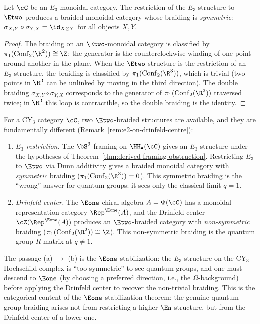 \begin{proposition}
\label{prop:e3-symmetric-braiding}
Let $\cC$ be an $E_3$-monoidal category. The restriction of the
$E_3$-structure to $\Etwo$ produces a braided monoidal category
whose braiding is \emph{symmetric}:
$\sigma_{X,Y} \circ \sigma_{Y,X} = \id_{X \otimes Y}$
for all objects $X, Y$.
\end{proposition}

\begin{proof}
The braiding on an $\Etwo$-monoidal category is classified by
$\pi_1(\mathrm{Conf}_2(\R^2)) \cong \Z$: the generator is
the counterclockwise winding of one point around another
in the plane. When the $\Etwo$-structure is the restriction
of an $E_3$-structure, the braiding is classified by
$\pi_1(\mathrm{Conf}_2(\R^3))$, which is trivial (two points
in $\R^3$ can be unlinked by moving in the third direction).
The double braiding
$\sigma_{X,Y} \circ \sigma_{Y,X}$ corresponds to the
generator of $\pi_1(\mathrm{Conf}_2(\R^2))$ traversed twice;
in $\R^3$ this loop is contractible, so the double braiding
is the identity.
\end{proof}

\begin{remark}
\label{rem:two-sources-e2}
For a CY$_3$ category $\cC$, two $\Etwo$-braided structures
are available, and they are fundamentally different
(Remark~\ref{rem:e2-on-drinfeld-centre}):
\begin{enumerate}[label=(\alph*)]
 \item \emph{$E_3$-restriction.}
 The $\bS^3$-framing on $\HH_\bullet(\cC)$ gives an
 $E_3$-structure under the hypotheses of Theorem~\ref{thm:derived-framing-obstruction}. Restricting $E_3$ to $\Etwo$
 via Dunn additivity gives a braided monoidal category
 with \emph{symmetric} braiding
 ($\pi_1(\mathrm{Conf}_2(\R^3)) = 0$). This symmetric
 braiding is the ``wrong'' answer for quantum groups: it sees
 only the classical limit $q = 1$.
 \item \emph{Drinfeld center.}
 The $\Eone$-chiral algebra $A = \Phi(\cC)$ has a monoidal
 representation category $\Rep^{\Eone}(A)$, and the Drinfeld
 center $\cZ(\Rep^{\Eone}(A))$ produces an $\Etwo$-braided
 category with \emph{non-symmetric} braiding
 ($\pi_1(\mathrm{Conf}_2(\R^2)) \cong \Z$). This
 non-symmetric braiding is the quantum group $R$-matrix at
 $q \neq 1$.
\end{enumerate}
The passage (a) $\to$ (b) is the $\Eone$ stabilization: the
$E_3$-structure on the CY$_3$ Hochschild complex is ``too
symmetric'' to see quantum groups, and one must descend to
$\Eone$ (by choosing a preferred direction, i.e., the
$\Omega$-background) before applying the Drinfeld center to
recover the non-trivial braiding. This is the categorical
content of the $\Eone$ stabilization theorem: the genuine
quantum group braiding arises not from restricting a
higher $\En$-structure, but from the Drinfeld center of a
lower one.
\end{remark}


